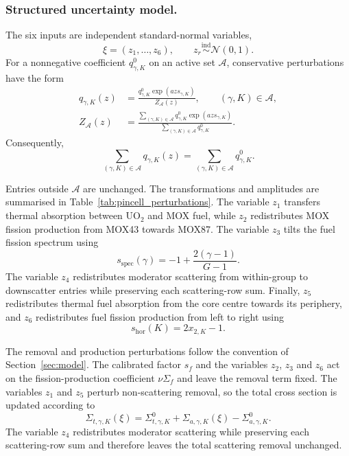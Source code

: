 \documentclass[final]{amsart}
\begin{document}
\subsubsection{Structured uncertainty model.}

The six inputs are independent standard-normal variables,
\begin{equation}
\xi=(z_1,\ldots,z_6),
\qquad
z_r\stackrel{\mathrm{ind}}{\sim}\mathcal N(0,1).
\label{eq:pincell_random_variables}
\end{equation}
For a nonnegative coefficient $q_{\gamma,K}^0$ on an active set
$\mathcal A$, conservative perturbations have the form
\begin{align}
q_{\gamma,K}(z)
&=
\frac{
q_{\gamma,K}^0
\exp(azs_{\gamma,K})
}{
Z_{\mathcal A}(z)
},
\qquad
(\gamma,K)\in\mathcal A,
\label{eq:pincell_conservative_transform}
\\
Z_{\mathcal A}(z)
&=
\frac{
\displaystyle
\sum_{(\gamma,K)\in\mathcal A}
q_{\gamma,K}^0\exp(azs_{\gamma,K})
}{
\displaystyle
\sum_{(\gamma,K)\in\mathcal A}q_{\gamma,K}^0
}.
\label{eq:pincell_conservative_normalisation}
\end{align}
Consequently,
\begin{equation}
\sum_{(\gamma,K)\in\mathcal A}q_{\gamma,K}(z)
=
\sum_{(\gamma,K)\in\mathcal A}q_{\gamma,K}^0.
\label{eq:pincell_conservative_identity}
\end{equation}

Entries outside $\mathcal A$ are unchanged. The transformations and
amplitudes are summarised in
Table~\ref{tab:pincell_perturbations}. The variable $z_1$ transfers
thermal absorption between UO$_2$ and MOX fuel, while $z_2$
redistributes MOX fission production from MOX43 towards MOX87. The
variable $z_3$ tilts the fuel fission spectrum using
\[
s_{\mathrm{spec}}(\gamma)
=
-1+\frac{2(\gamma-1)}{G-1}.
\]
The variable $z_4$ redistributes moderator scattering from
within-group to downscatter entries while preserving each
scattering-row sum. Finally, $z_5$ redistributes thermal fuel
absorption from the core centre towards its periphery, and $z_6$
redistributes fuel fission production from left to right using
\[
s_{\mathrm{hor}}(K)=2x_{2,K}-1.
\]

The removal and production perturbations follow the convention of
Section~\ref{sec:model}. The calibrated factor $s_f$ and the variables
$z_2$, $z_3$ and $z_6$ act on the fission-production coefficient
$\nu\Sigma_f$ and leave the removal term fixed. The variables $z_1$ and
$z_5$ perturb non-scattering removal, so the total cross section is
updated according to
\begin{equation}
\Sigma_{t,\gamma,K}(\xi)
=
\Sigma_{t,\gamma,K}^{0}
+
\Sigma_{a,\gamma,K}(\xi)
-
\Sigma_{a,\gamma,K}^{0}.
\label{eq:pincell_total_cross_section_update}
\end{equation}
The variable $z_4$ redistributes moderator scattering while preserving
each scattering-row sum and therefore leaves the total scattering
removal unchanged.
\end{document}
